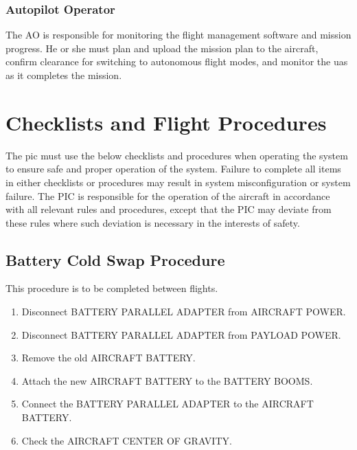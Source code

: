 \documentclass{report}
\begin{document}
		\subsection{Autopilot Operator}
			The \gls{AO} is responsible for monitoring the flight management software and mission progress.  He or she must plan and upload the mission plan to the aircraft, confirm clearance for switching to autonomous flight modes, and monitor the \gls{uas} as it completes the mission.
\chapter{Checklists and Flight Procedures}
	The \gls{pic} must use the below checklists and procedures when operating the system to ensure safe and proper operation of the system.  Failure to complete all items in either checklists or procedures may result in system misconfiguration or system failure.  The PIC is responsible for the operation of the aircraft in accordance with all relevant rules and procedures, except that the PIC may deviate from these rules where such deviation is necessary in the interests of safety.
	\section{Battery Cold Swap Procedure}
		This procedure is to be completed between flights.
		\begin{enumerate}
			\item Disconnect BATTERY PARALLEL ADAPTER from AIRCRAFT POWER.
			\item Disconnect BATTERY PARALLEL ADAPTER from PAYLOAD POWER.
			\item Remove the old AIRCRAFT BATTERY.
			\item Attach the new AIRCRAFT BATTERY to the BATTERY BOOMS.
			\item Connect the BATTERY PARALLEL ADAPTER to the AIRCRAFT BATTERY.
			\item Check the AIRCRAFT CENTER OF GRAVITY.
		\end{enumerate}
\end{document}
